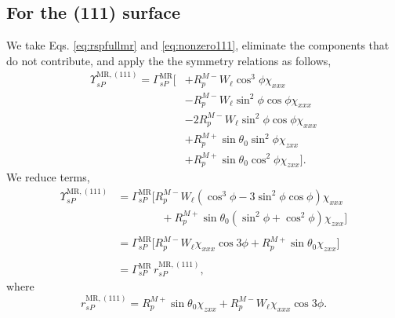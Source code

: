 \subsection{For the (111) surface}

We take Eqs. \eqref{eq:rspfullmr} and \eqref{eq:nonzero111}, eliminate the
components that do not contribute, and apply the the symmetry relations as
follows,
\begin{equation*}
\begin{split}
\Upsilon^{\mathrm{MR},(111)}_{sP} =
\Gamma^{\mathrm{MR}}_{sP}
\big[
&+ R^{M-}_{p}W_{\ell}\cos^{3}\phi\chi_{xxx}\\
&- R^{M-}_{p}W_{\ell}\sin^{2}\phi\cos\phi\chi_{xxx}\\
&- 2R^{M-}_{p}W_{\ell}\sin^{2}\phi\cos\phi\chi_{xxx}\\
&+ R^{M+}_{p}\sin\theta_{0}\sin^{2}\phi\chi_{zxx}\\
&+ R^{M+}_{p}\sin\theta_{0}\cos^{2}\phi\chi_{zxx}
\big].
\end{split}
\end{equation*}
We reduce terms,
\begin{equation*}
\begin{split}
\Upsilon^{\mathrm{MR},(111)}_{sP} &=
\Gamma^{\mathrm{MR}}_{sP}
\big[
R^{M-}_{p}W_{\ell}(\cos^{3}\phi - 3\sin^{2}\phi\cos\phi)\chi_{xxx}\\
&\qquad\qquad+ R^{M+}_{p}\sin\theta_{0}(\sin^{2}\phi + \cos^{2}\phi)\chi_{zxx}
\big]\\\\
&=
\Gamma^{\mathrm{MR}}_{sP}
\big[
R^{M-}_{p}W_{\ell}\chi_{xxx}\cos3\phi + R^{M+}_{p}\sin\theta_{0}\chi_{zxx}
\big]\\\\
& = \Gamma^{\mathrm{MR}}_{sP}\,r^{\mathrm{MR},(111)}_{sP},
\end{split}
\end{equation*}
where
\begin{equation}\label{eq:final-rsp.mr.111}
r^{\mathrm{MR},(111)}_{sP} = 
R^{M+}_{p}\sin\theta_{0}\chi_{zxx} + R^{M-}_{p}W_{\ell}\chi_{xxx}\cos3\phi.
\end{equation}

